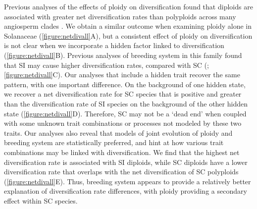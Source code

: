 Previous analyses of the effects of ploidy on diversification found that diploids are associated with greater net diversification rates than polyploids across many angiosperm clades \citep{mayrose_2011, mayrose_2015}. 
We obtain a similar outcome when examining ploidy alone in Solanaceae (\cref{figure:netdivall}A), but a consistent effect of ploidy on diversification is not clear when we incorporate a hidden factor linked to diversification (\cref{figure:netdivall}B).
%
Previous analyses of breeding system in this family found that SI may cause higher diversification rates, compared with SC (\citealt{goldberg_2010}; \cref{figure:netdivall}C).
Our analyses that include a hidden trait recover the same pattern, with one important difference.
On the background of one hidden state, we recover a net diversification rate for SC species that is positive and greater than the diversification rate of SI species on the background of the other hidden state (\cref{figure:netdivall}D). 
Therefore, SC may not be a `dead end' when coupled with some unknown trait combinations or processes not modeled by these two traits. 
%
Our analyses also reveal that models of joint evolution of ploidy and breeding system are statistically preferred, and hint at how various trait combinations may be linked with diversification.
We find that the highest net diversification rate is associated with SI diploids, while SC diploids have a lower diversification rate that overlaps with the net diversification of SC polyploids (\cref{figure:netdivall}E).
Thus, breeding system appears to provide a relatively better explanation of diversification rate differences, with ploidy providing a secondary effect within SC species.


